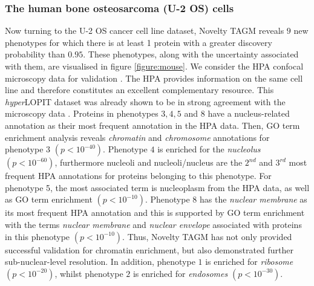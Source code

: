 \documentclass[12pt,english]{article}
\begin{document}
\subsubsection{The human bone osteosarcoma (U-2 OS) cells}
Now turning to the U-2 OS cancer cell line dataset, Novelty TAGM reveals $9$ new phenotypes for which there is at least 1 protein with a greater discovery probability than $0.95$. These phenotypes, along with the uncertainty associated with them, are visualised in figure \ref{figure:mouse}. We consider the HPA confocal microscopy data for validation \citep{Thul:2017, Sullivan:2018}. The HPA provides information on the same cell line and therefore constitutes an excellent complementary resource. This \textit{hyper}LOPIT dataset was already shown to be in strong agreement with the microscopy data \citep{Thul:2017, DC:2018}. Proteins in phenotypes $3,4,5$ and $8$ have a nucleus-related annotation as their most frequent annotation in the HPA data. Then, GO term enrichment analysis reveals \textit{chromatin} and \textit{chromosome} annotations for phenotype 3 $(p < 10^{-40})$. Phenotype $4$ is enriched for the \textit{nucleolus} $(p < 10^{-60})$, furthermore nucleoli and nucleoli/nucleus are the $2^{nd}$ and $3^{rd}$ most frequent HPA annotations for proteins belonging to this phenotype. For phenotype 5, the most associated term is nucleoplasm from the HPA data, as well as GO term enrichment $(p < 10^{-10})$. Phenotype $8$ has the \textit{nuclear membrane} as its most frequent HPA annotation and this is supported by GO term enrichment with the terms \textit{nuclear membrane} and \textit{nuclear envelope} associated with proteins in this phenotype $(p < 10^{-10})$. Thus, Novelty TAGM has not only provided successful validation for chromatin enrichment, but also demonstrated further sub-nuclear-level resolution. In addition, phenotype $1$ is enriched for \textit{ribosome} $( p < 10^{-20})$, whilst phenotype $2$ is enriched for \textit{endosomes} $(p < 10^{-30})$.
\end{document}
